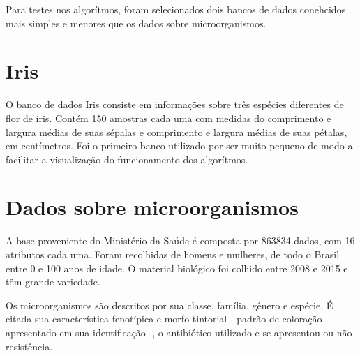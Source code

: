 Para testes nos algorítmos, foram selecionados dois bancos de dados conehcidos
mais simples e menores que os dados sobre microorganismos.

\section{Iris}
O banco de dados Iris \cite{uci} consiste em informações sobre três espécies 
diferentes de flor de íris. Contém 150 amostras cada uma com medidas do 
comprimento e largura médias de suas sépalas e comprimento e largura médias de 
suas pétalas, em centímetros. Foi o primeiro banco utilizado por ser muito pequeno
de modo a facilitar a visualização do funcionamento dos algorítmos.



\section{Dados sobre microorganismos}
A base proveniente do Ministério da Saúde é composta por 863834 dados, com 16 atributos cada uma. Foram recolhidas de homens e mulheres, de todo o Brasil entre 0 e 100 anos de idade. O material biológico foi colhido entre 2008 e 2015 e têm grande variedade.

Os microorganismos são descritos por sua classe, família, gênero e espécie. É citada sua característica fenotípica e morfo-tintorial - padrão de coloração apresentado em sua identificação -, o antibiótico utilizado e se apresentou ou não resistência.